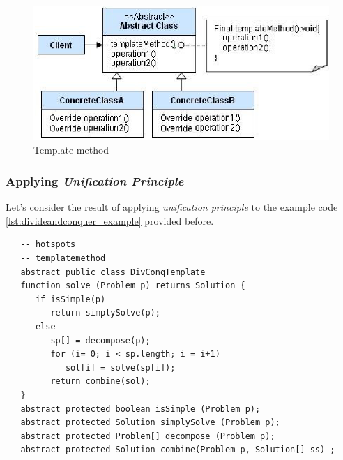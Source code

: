 \begin{figure}[htbp]
   \centering
   \includegraphics{images/dp_templatemethod.png}
   \caption{Template method}
   \label{fig:dp_templatemethod}
\end{figure}

\subsubsection{Applying \textit{Unification Principle}}
Let's consider the result of applying \textit{unification principle} to the example code \ref{lst:divideandconquer_example} provided before.
\begin{lstlisting}
   -- hotspots
   -- templatemethod
   abstract public class DivConqTemplate
   function solve (Problem p) returns Solution {
      if isSimple(p)
         return simplySolve(p);
      else
         sp[] = decompose(p);
         for (i= 0; i < sp.length; i = i+1)
            sol[i] = solve(sp[i]);
         return combine(sol);
   }
   abstract protected boolean isSimple (Problem p);
   abstract protected Solution simplySolve (Problem p);
   abstract protected Problem[] decompose (Problem p);
   abstract protected Solution combine(Problem p, Solution[] ss) ;
\end{lstlisting}
\lstset{style=javaBlock}

